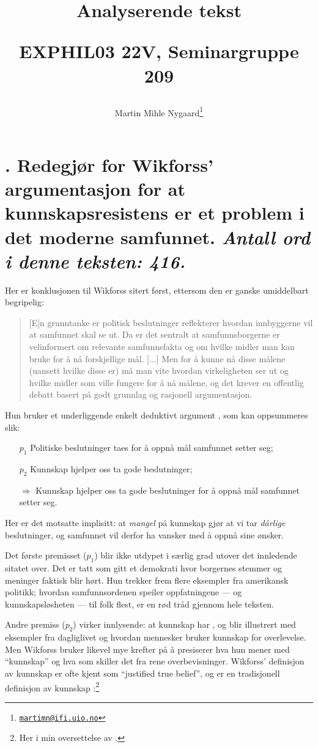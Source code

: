 \documentclass[a4paper,norsk]{article}
\title{Analyserende tekst \par {\large EXPHIL03 22V, Seminargruppe 209\par}}
\author{Martin Mihle Nygaard\footnote{\href{mailto:martimn@ifi.uio.no}{\nolinkurl{martimn@ifi.uio.no}}}}
\date{}
\begin{document}
\maketitle

\section*{\normalsize{}. Redegjør for Wikforss’ argumentasjon for at kunnskapsresistens er et
  problem i det moderne samfunnet. \emph{Antall ord i denne teksten: 416.}
}

Her er konklusjonen til Wikforss sitert først, ettersom den er ganske
umiddelbart begripelig: \blockquote[{\cite[98]{wikforss}}]{[E]n grunntanke er
  politisk beslutninger reflekterer hvordan innbyggerne vil at samfunnet skal
  se ut. Da er det sentralt at samfunnsborgerne er velinformert om relevante
  samfunnsfakta og om hvilke midler man kan bruke for å nå forskjellige mål.
  [...] Men for å kunne nå disse målene (uansett hvilke disse er) må man vite
  hvordan virkeligheten ser ut og hvilke midler som ville fungere for å nå
  målene, og det krever en offentlig debatt basert på godt grunnlag og
  rasjonell argumentasjon.}

Hun bruker et underliggende enkelt deduktivt argument \autocite[98]{wikforss},
som kan oppsummeres slik:

\begin{itemize}
  \item[\it $p_1$] Politiske beslutninger taes for å oppnå mål samfunnet setter seg;
  \item[\it $p_2$] Kunnskap hjelper oss ta gode beslutninger;
  \item[$\Rightarrow$] Kunnskap hjelper oss ta gode beslutninger for å oppnå
    mål samfunnet setter seg.
\end{itemize}

Her er det motsatte implisitt: at \emph{mangel} på kunnskap gjør at vi tar
\emph{dårlige} beslutninger, og samfunnet vil derfor ha vansker med å oppnå
sine ønsker.

Det første premisset ($p_1$) blir ikke utdypet i særlig grad utover det
innledende sitatet over. Det er tatt som gitt et demokrati hvor borgernes
stemmer og meninger faktisk blir hørt. Hun trekker frem flere eksempler fra
amerikansk politikk; hvordan samfunnsordenen speiler oppfatningene --- og
kunnskapsløsheten --- til folk flest, er en rød tråd gjennom hele teksten.

Andre premiss ($p_2$) virker innlysende: at kunnskap har
, og blir illustrert med eksempler fra
dagliglivet og hvordan mennesker bruker kunnskap for overlevelse. Men Wikforss
bruker likevel mye krefter på å presiserer hva hun mener med
\enquote{kunnskap} og hva som skiller det fra rene overbevisninger. Wikforss'
definisjon av kunnskap er ofte kjent som \enquote{justified true belief}, og er
en tradisjonell definisjon av kunnskap
\autocites[87]{wikforss}{sep-knowledge-analysis}:\footnote{Her i min
oversettelse av \cite{sep-knowledge-analysis}.}
\end{document}
